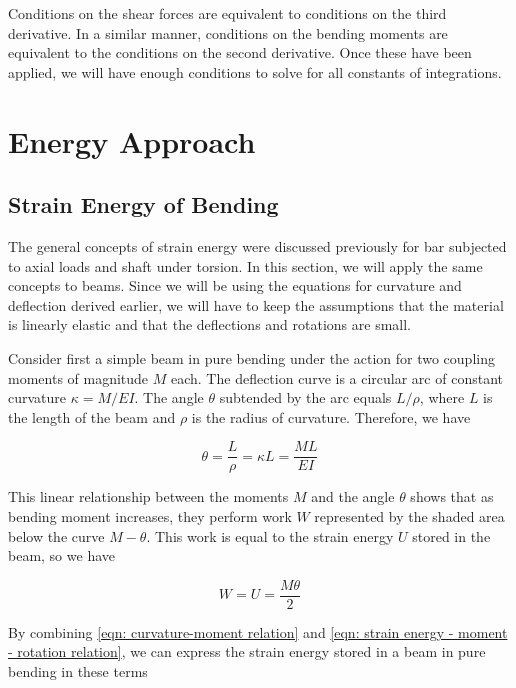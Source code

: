 \documentclass[
10pt,
a4paper,
openany,
svgnames,
]{book} %
\begin{document}
Conditions on the shear forces are equivalent to conditions on the third derivative. In a similar manner, conditions on the bending moments are equivalent to the conditions on the second derivative. Once these have been applied, we will have enough conditions to solve for all constants of integrations.

\section{Energy Approach}

\subsection{Strain Energy of Bending}

The general concepts of strain energy were discussed previously for bar subjected to axial loads and shaft under torsion. In this section, we will apply the same concepts to beams. Since we will be using the equations for curvature and deflection derived earlier, we will have to keep the assumptions that the material is linearly elastic and that the deflections and rotations are small.

Consider first a simple beam in pure bending under the action for two coupling moments of magnitude $M$ each. The deflection curve is a circular arc of constant curvature $\kappa = M/EI$. The angle $\theta$ subtended by the arc equals $L/\rho$, where $L$ is the length of the beam and $\rho$ is the radius of curvature. Therefore, we have

\begin{equation} \label{eqn: curvature-moment relation}
  \theta  = \frac{L}{\rho } = \kappa L = \frac{ML}{EI}
\end{equation}

This linear relationship between the moments $M$ and the angle $\theta$ shows that as bending moment increases, they perform work $W$ represented by the shaded area below the curve $M-\theta$. This work is equal to the strain energy $U$ stored in the beam, so we have

\begin{equation} \label{eqn: strain energy - moment - rotation relation}
  W = U = \frac{M\theta}{2}
\end{equation}

By combining \cref{eqn: curvature-moment relation} and \cref{eqn: strain energy - moment - rotation relation}, we can express the strain energy stored in a beam in pure bending in these terms
\end{document}
